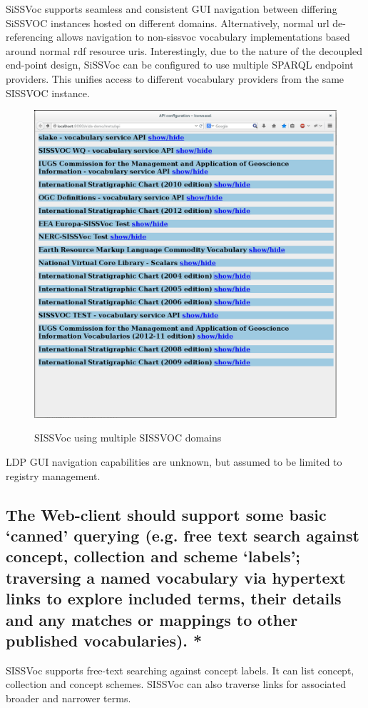 \documentclass[10pt,a4paper]{article}
\begin{document}
\begin{flushleft}
{
SiSSVoc supports seamless and consistent GUI navigation between differing
SiSSVOC instances hosted on different domains.
%
Alternatively, normal url de-referencing allows navigation to non-sissvoc
vocabulary implementations based around normal rdf resource uris.
%
Interestingly, due to the nature of the decoupled end-point design, SiSSVoc 
can be configured to use multiple SPARQL endpoint providers. This unifies access
to different vocabulary providers from the same SISSVOC instance. 

\begin{figure}[H]
\centering
\caption{SISSVoc using multiple SISSVOC domains}
\includegraphics[width=12cm]{multipleendpoints}  
\label{fig:test}
\end{figure}

LDP GUI navigation capabilities are unknown, but assumed to be limited to 
registry management.
}
%
%
\subsection{ The Web-client should support some basic ‘canned’ querying (e.g.
free text search against concept, collection and scheme ‘labels’; traversing a
named vocabulary via hypertext links to explore included terms, their details
and any matches or mappings to other published vocabularies). * }
%
SISSVoc supports free-text searching against concept labels. It can list
concept, collection and concept schemes. SISSVoc can also traverse links 
for associated broader and narrower terms. 


\end{flushleft}
\end{document}
